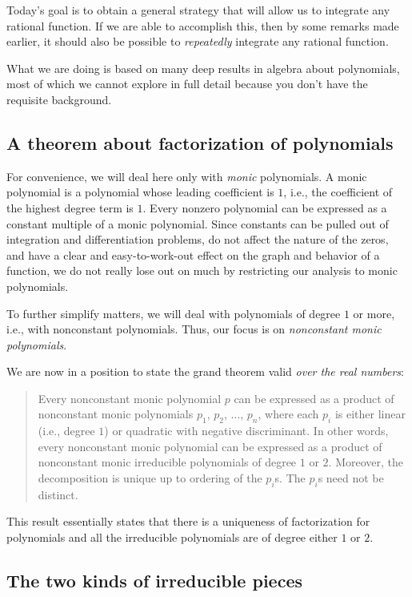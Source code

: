 \documentclass[10pt]{amsart}
\begin{document}
Today's goal is to obtain a general strategy that will allow us to
integrate any rational function. If we are able to accomplish this,
then by some remarks made earlier, it should also be possible to {\em
repeatedly} integrate any rational function.

What we are doing is based on many deep results in algebra about
polynomials, most of which we cannot explore in full detail because
you don't have the requisite background.

\subsection{A theorem about factorization of polynomials}

For convenience, we will deal here only with {\em monic}
polynomials. A monic polynomial is a polynomial whose leading
coefficient is $1$, i.e., the coefficient of the highest degree term
is $1$. Every nonzero polynomial can be expressed as a constant
multiple of a monic polynomial. Since constants can be pulled out of
integration and differentiation problems, do not affect the nature of
the zeros, and have a clear and easy-to-work-out effect on the graph
and behavior of a function, we do not really lose out on much by
restricting our analysis to monic polynomials.

To further simplify matters, we will deal with polynomials of degree
$1$ or more, i.e., with nonconstant polynomials. Thus, our focus is on
{\em nonconstant monic polynomials}.

We are now in a position to state the grand theorem valid {\em over
the real numbers}:

\begin{quote}
  Every nonconstant monic polynomial $p$ can be expressed as a product
  of nonconstant monic polynomials $p_1$, $p_2$, $\dots$, $p_n$, where
  each $p_i$ is either linear (i.e., degree $1$) or quadratic with
  negative discriminant. In other words, every nonconstant monic
  polynomial can be expressed as a product of nonconstant monic
  irreducible polynomials of degree $1$ or $2$. Moreover, the
  decomposition is unique up to ordering of the $p_i$s. The $p_i$s
  need not be distinct.
\end{quote}

This result essentially states that there is a uniqueness of
factorization for polynomials and all the irreducible polynomials are
of degree either $1$ or $2$.

\subsection{The two kinds of irreducible pieces}
\end{document}
